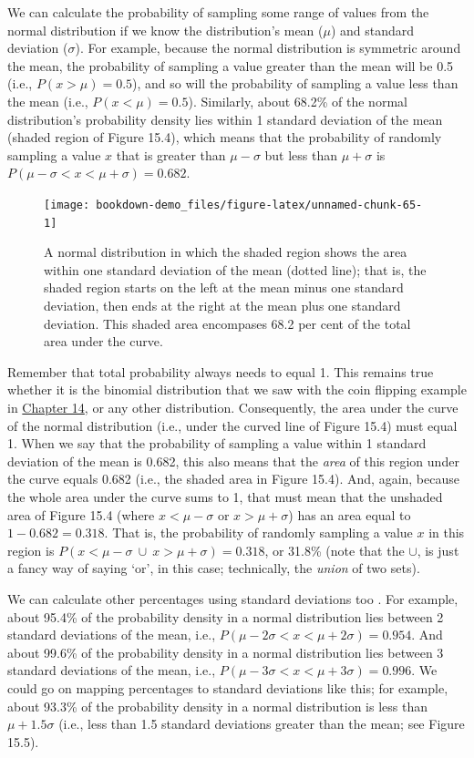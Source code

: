 \documentclass[
]{scrbook}
\begin{document}
We can calculate the probability of sampling some range of values from the normal distribution if we know the distribution's mean (\(\mu\)) and standard deviation (\(\sigma\)).
For example, because the normal distribution is symmetric around the mean, the probability of sampling a value greater than the mean will be 0.5 (i.e., \(P(x > \mu) = 0.5\)), and so will the probability of sampling a value less than the mean (i.e., \(P(x < \mu) = 0.5\)).
Similarly, about 68.2\% of the normal distribution's probability density lies within 1 standard deviation of the mean (shaded region of Figure 15.4), which means that the probability of randomly sampling a value \(x\) that is greater than \(\mu - \sigma\) but less than \(\mu + \sigma\) is \(P(\mu - \sigma < x < \mu + \sigma) = 0.682\).

\begin{figure}
\texttt{[image: bookdown-demo\_files/figure-latex/unnamed-chunk-65-1]} \caption{A normal distribution in which the shaded region shows the area within one standard deviation of the mean (dotted line); that is, the shaded region starts on the left at the mean minus one standard deviation, then ends at the right at the mean plus one standard deviation. This shaded area encompases 68.2 per cent of the total area under the curve.}\label{fig:unnamed-chunk-65}
\end{figure}

Remember that total probability always needs to equal 1.
This remains true whether it is the binomial distribution that we saw with the coin flipping example in \protect\hyperlink{Chapter_14}{Chapter 14}, or any other distribution.
Consequently, the area under the curve of the normal distribution (i.e., under the curved line of Figure 15.4) must equal 1.
When we say that the probability of sampling a value within 1 standard deviation of the mean is 0.682, this also means that the \emph{area} of this region under the curve equals 0.682 (i.e., the shaded area in Figure 15.4).
And, again, because the whole area under the curve sums to 1, that must mean that the unshaded area of Figure 15.4 (where \(x < \mu -\sigma\) or \(x > \mu + \sigma\)) has an area equal to \(1 - 0.682 = 0.318\).
That is, the probability of randomly sampling a value \(x\) in this region is \(P(x < \mu - \sigma \: \cup \: x > \mu + \sigma) = 0.318\), or 31.8\% (note that the \(\cup\), is just a fancy way of saying `or', in this case; technically, the \emph{union} of two sets).

We can calculate other percentages using standard deviations too \citep{Sokal1995}.
For example, about 95.4\% of the probability density in a normal distribution lies between 2 standard deviations of the mean, i.e., \(P(\mu - 2\sigma < x < \mu + 2\sigma) = 0.954\).
And about 99.6\% of the probability density in a normal distribution lies between 3 standard deviations of the mean, i.e., \(P(\mu - 3\sigma < x < \mu + 3\sigma) = 0.996\).
We could go on mapping percentages to standard deviations like this; for example, about 93.3\% of the probability density in a normal distribution is less than \(\mu + 1.5\sigma\) (i.e., less than 1.5 standard deviations greater than the mean; see Figure 15.5).
\end{document}
